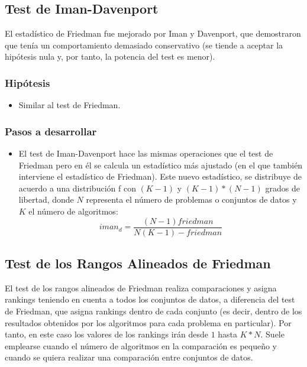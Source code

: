 
\subsection{Test de Iman-Davenport}
El estadístico de Friedman fue mejorado por Iman y Davenport, que demostraron que tenía un comportamiento
demasiado conservativo (se tiende a aceptar la hipótesis nula y, por tanto, la potencia del test es menor).

\subsubsection{Hipótesis}
\begin{itemize}
\item Similar al test de Friedman.
\end{itemize}

\subsubsection{Pasos a desarrollar}
\begin{itemize}
\item El test de Iman-Davenport hace las mismas operaciones que el test de Friedman pero en él se calcula
un estadístico más ajustado (en el que también interviene el estadístico de Friedman). Este nuevo estadístico,
se distribuye de acuerdo a una distribución f con $(K-1)$ y $(K-1)*(N-1)$ grados de libertad, donde $N$
representa el número de problemas o conjuntos de datos y $K$ el número de algoritmos:
\[ iman_d = \frac{(N-1)friedman}{N(K-1)-friedman} \]
\end{itemize}


\subsection{Test de los Rangos Alineados de Friedman}
El test de los rangos alineados de Friedman realiza comparaciones y asigna rankings teniendo en cuenta a
todos los conjuntos de datos, a diferencia del test de Friedman, que asigna rankings dentro de cada conjunto
(es decir, dentro de los resultados obtenidos por los algoritmos para cada problema en particular). Por tanto,
en este caso los valores de los rankings irán desde $1$ hasta $K*N$. Suele emplearse cuando el número de
algoritmos en la comparación es pequeño y cuando se quiera realizar una comparación entre conjuntos de datos.

